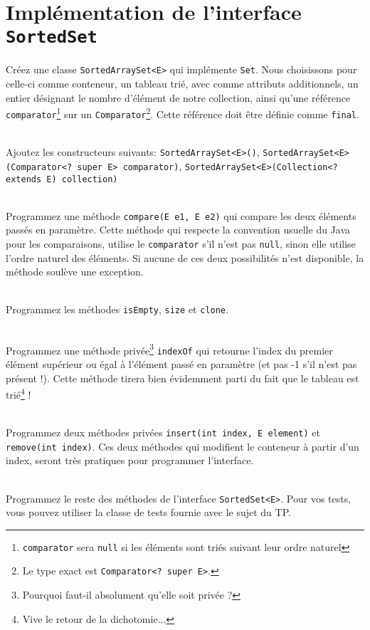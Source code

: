 \documentclass[iutinfo,a4paper,10pt]{ustl-tdtp}
\begin{document}
\section{Implémentation de l'interface \texttt{SortedSet}}

\question Créez une classe \texttt{SortedArraySet<E>} qui implémente \texttt{Set}. Nous choisissons pour celle-ci comme conteneur, un tableau trié, avec comme attributs additionnels, un entier désignant le nombre d'élément de notre collection, ainsi qu'une référence \texttt{comparator}\footnote{\texttt{comparator} sera \texttt{null} si les éléments sont triés suivant leur ordre naturel} sur un \texttt{Comparator}\footnote{Le type exact est \texttt{Comparator<? super E>}.}. Cette référence doit être définie comme \texttt{final}.

~\\ \question Ajoutez les constructeurs suivants: \texttt{SortedArraySet<E>()}, 
\texttt{SortedArraySet<E>(Comparator<? super E> comparator)}, 
\texttt{SortedArraySet<E>(Collection<? extends E) collection)} 

~\\ \question Programmez une méthode \texttt{compare(E e1, E e2)} qui compare les deux éléments passés en paramètre. Cette méthode qui respecte la convention usuelle du Java pour les comparaisons, utilise le \texttt{comparator} s'il n'est pas \texttt{null}, sinon elle utilise l'ordre naturel des éléments. Si aucune de ces deux possibilités n'est disponible, la méthode soulève une exception.

~\\ \question Programmez les méthodes \texttt{isEmpty},  \texttt{size} et \texttt{clone}.

~\\ \question Programmez une méthode privée\footnote{Pourquoi faut-il absolument qu'elle soit privée ?} \texttt{indexOf} qui retourne l'index du premier élément supérieur ou égal à l'élément passé en paramètre (et pas -1 s'il n'est pas présent !). Cette méthode tirera bien évidemment parti du fait que le tableau est trié\footnote{Vive le retour de la dichotomie...} ! 

~\\ \question Programmez deux méthodes privées \texttt{insert(int index, E element)} et \texttt{remove(int index)}. Ces deux méthodes qui modifient le conteneur à partir d'un index, seront très pratiques pour programmer l'interface.

~\\ \question Programmez le reste des méthodes de l'interface \texttt{SortedSet<E>}. Pour vos tests, vous pouvez utiliser la classe de tests fournie avec le sujet du TP.
\end{document}

